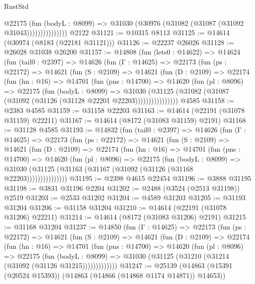 \begin{lexlean}{RustStd}
\begin{coremodule}
                      @22175
                        (fun (bodyL : @8099) =>
                        @31030 (@30976 (@31082 (@31087 (@31092 @31043)))))))))))))))
    @2122
@31121 := @10315 @8113
@31125 := @14614 (@30974 (@8183 (@22181 @31121)))
@31126 := @22237 @26026
@31128 := @26028 @31038 @26200
@31157 := @14808
    (fun (lets0 : @14622) =>
    @14624
      (fun (tail0 : @2397) =>
      @14626
        (fun (Γ : @14625) =>
        @22173
          (fun (ps : @22172) =>
          @14621
            (fun (S : @2109) =>
            @14621
              (fun (D : @2109) =>
              @22174
                (fun (hn : @16) =>
                @14701
                  (fun (pns : @14700) =>
                  @14620
                    (fun (pl : @8096) =>
                    @22175
                      (fun (bodyL : @8099) =>
                      @31030
                        (@31125
                          (@31082 (@31087 (@31092 (@31126 (@31128 @22201 @22203))))))))))))))))
    @4585
@31158 := @2383 @4585
@31159 := @31158 @22203
@31163 := @14614 (@22191 (@31078 @31159) @22211)
@31167 := @14614 (@8172 (@31083 @31159) @2191)
@31168 := @31128 @4585
@31193 := @14832
    (fun (tail0 : @2397) =>
    @14626
      (fun (Γ : @14625) =>
      @22173
        (fun (ps : @22172) =>
        @14621
          (fun (S : @2109) =>
          @14621
            (fun (D : @2109) =>
            @22174
              (fun (hn : @16) =>
              @14701
                (fun (pns : @14700) =>
                @14620
                  (fun (pl : @8096) =>
                  @22175
                    (fun (bodyL : @8099) =>
                    @31030 (@31125 (@31163 (@31167 (@31092 (@31126 (@31168 @22203)))))))))))))))
@31195 := @2398 @4615 @22454
@31196 := @3888 @31195
@31198 := @3831 @31196 @2204
@31202 := @2488 (@3524 (@2513 @31198)) @2519
@31203 := @2533 @31202
@31204 := @4589 @31203
@31205 := @31193 @31204
@31206 := @31158 @31204
@31210 := @14614 (@22191 (@31078 @31206) @22211)
@31214 := @14614 (@8172 (@31083 @31206) @2191)
@31215 := @31168 @31204
@31237 := @14850
    (fun (Γ : @14625) =>
    @22173
      (fun (ps : @22172) =>
      @14621
        (fun (S : @2109) =>
        @14621
          (fun (D : @2109) =>
          @22174
            (fun (hn : @16) =>
            @14701
              (fun (pns : @14700) =>
              @14620
                (fun (pl : @8096) =>
                @22175
                  (fun (bodyL : @8099) =>
                  @31030 (@31125 (@31210 (@31214 (@31092 (@31126 @31215)))))))))))))
@31247 := @25139 (@14863 (@15391 (@20524 @15393)) (@14863 (@14866 (@14868 @1174 @14871)) @14653))

\end{coremodule}
\end{lexlean}
